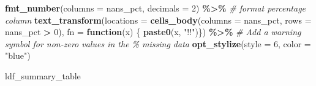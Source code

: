 \documentclass[
]{article}
\newenvironment{Shaded}{\begin{snugshade}}{\end{snugshade}}
\newcommand{\AttributeTok}[1]{\textcolor[rgb]{0.13,0.29,0.53}{#1}}
\newcommand{\CommentTok}[1]{\textcolor[rgb]{0.56,0.35,0.01}{\textit{#1}}}
\newcommand{\ControlFlowTok}[1]{\textcolor[rgb]{0.13,0.29,0.53}{\textbf{#1}}}
\newcommand{\DecValTok}[1]{\textcolor[rgb]{0.00,0.00,0.81}{#1}}
\newcommand{\FunctionTok}[1]{\textcolor[rgb]{0.13,0.29,0.53}{\textbf{#1}}}
\newcommand{\NormalTok}[1]{#1}
\newcommand{\SpecialCharTok}[1]{\textcolor[rgb]{0.81,0.36,0.00}{\textbf{#1}}}
\newcommand{\StringTok}[1]{\textcolor[rgb]{0.31,0.60,0.02}{#1}}
\begin{document}
\begin{Shaded}
\begin{Highlighting}[]
  \FunctionTok{fmt\_number}\NormalTok{(}\AttributeTok{columns =}\NormalTok{ nans\_pct, }\AttributeTok{decimals =} \DecValTok{2}\NormalTok{) }\SpecialCharTok{\%\textgreater{}\%}  \CommentTok{\# format percentage column}
  \FunctionTok{text\_transform}\NormalTok{(}\AttributeTok{locations =} \FunctionTok{cells\_body}\NormalTok{(}\AttributeTok{columns =}\NormalTok{ nans\_pct, }\AttributeTok{rows =}\NormalTok{ nans\_pct }\SpecialCharTok{\textgreater{}} \DecValTok{0}\NormalTok{),}
                 \AttributeTok{fn =} \ControlFlowTok{function}\NormalTok{(x) \{ }\FunctionTok{paste0}\NormalTok{(x, }\StringTok{"!!"}\NormalTok{)\}) }\SpecialCharTok{\%\textgreater{}\%}  \CommentTok{\# Add a warning symbol for non{-}zero values in the \% missing data}
  \FunctionTok{opt\_stylize}\NormalTok{(}\AttributeTok{style =} \DecValTok{6}\NormalTok{, }\AttributeTok{color =} \StringTok{"blue"}\NormalTok{)}

\NormalTok{ldf\_summary\_table}
\end{Highlighting}
\end{Shaded}
\end{document}
